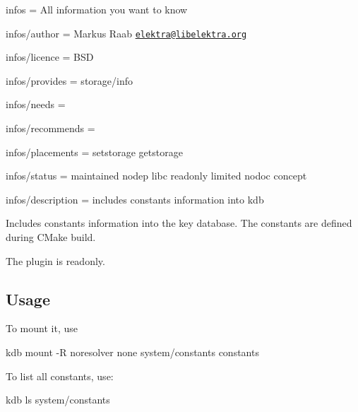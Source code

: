 
\begin{DoxyItemize}
\item infos = All information you want to know
\item infos/author = Markus Raab \href{mailto:elektra@libelektra.org}{\tt elektra@libelektra.\+org}
\item infos/licence = B\+S\+D
\item infos/provides = storage/info
\item infos/needs =
\item infos/recommends =
\item infos/placements = setstorage getstorage
\item infos/status = maintained nodep libc readonly limited nodoc concept
\item infos/description = includes constants information into kdb
\end{DoxyItemize}

Includes constants information into the key database. The constants are defined during C\+Make build.

The plugin is readonly.

\subsection*{Usage}

To mount it, use \begin{DoxyVerb}kdb mount -R noresolver none system/constants constants
\end{DoxyVerb}


To list all constants, use\+: \begin{DoxyVerb}kdb ls system/constants\end{DoxyVerb}
 